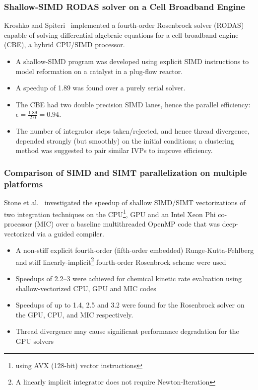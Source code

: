 \documentclass{beamer}
\newcounter{stiff}
\begin{document}
\begin{frame}
 \frametitle{Shallow-SIMD RODAS solver on a Cell Broadband Engine}
 Kroshko and Spiteri~ implemented a fourth-order Rosenbrock solver (RODAS) capable of solving differential algebraic equations for a cell broadband engine (CBE), a hybrid CPU\slash SIMD processor.
 \begin{itemize}
  \item A shallow-SIMD program was developed using explicit SIMD instructions to model  reformation on a  catalyst in a plug-flow reactor.
  \item A speedup of \SI{1.89}{\times} was found over a purely serial solver.
  \item The CBE had two double precision SIMD lanes, hence the parallel efficiency: $\epsilon = \frac{1.89}{2.0} = 0.94$.
  \item The number of integrator steps taken\slash rejected, and hence thread divergence, depended strongly (but smoothly) on the initial conditions; a clustering method was suggested to pair similar IVPs to improve efficiency.
 \end{itemize}
\end{frame}

\begin{frame}[allowframebreaks]
 \frametitle{Comparison of SIMD and SIMT parallelization on multiple platforms}
 Stone et al.~ investigated the speedup of shallow SIMD\slash SIMT vectorizations of two integration techniques on the CPU\footnote{using AVX (128-bit) vector instructions}, GPU and an Intel Xeon Phi co-processor (MIC) over a baseline multithreaded OpenMP code that was deep-vectorized via a guided compiler.
 \begin{itemize}
  \item A non-stiff explicit fourth-order (fifth-order embedded) Runge-Kutta-Fehlberg and stiff linearly-implicit\footnote{A linearly implicit integrator does not require Newton-Iteration} fourth-order Rosenbrock scheme were used
  \item Speedups of \SIrange{2.2}{3}{\times} were achieved for chemical kinetic rate evaluation using shallow-vectorized CPU, GPU and MIC codes
  \item Speedups of up to \SI{1.4}{\times}, \SI{2.5}{\times} and \SI{3.2}{\times} were found for the Rosenbrock solver on the GPU, CPU, and MIC respectively.
  \item Thread divergence may cause significant performance degradation for the GPU solvers
 \end{itemize}
\end{frame}
\end{document}
